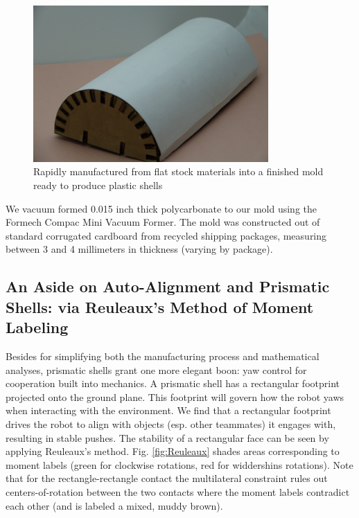 \documentclass[letterpaper]{report}
\begin{document}
\begin{figure}
\centering
\includegraphics[width=0.8\textwidth]{FinishedMold.jpg}
\caption{\label{fig:Finished Mold}Rapidly manufactured from flat stock materials into a finished mold ready to produce plastic shells}
\end{figure}

We vacuum formed 0.015 inch thick polycarbonate to our mold using the Formech Compac Mini Vacuum Former.
The mold was constructed out of standard corrugated cardboard from recycled shipping packages, measuring between 3 and 4 millimeters in thickness (varying by package).

\subsection{An Aside on Auto-Alignment and Prismatic Shells: via Reuleaux's Method of Moment Labeling \label{sec:Reuleaux}}
Besides for simplifying both the manufacturing process and mathematical analyses, prismatic shells grant one more elegant boon: yaw control for cooperation built into mechanics.
A prismatic shell has a rectangular footprint projected onto the ground plane.
This footprint will govern how the robot yaws when interacting with the environment.
We find that a rectangular footprint drives the robot to align with objects (esp. other teammates) it engages with, resulting in stable pushes.
The stability of a rectangular face can be seen by applying Reuleaux's method.
Fig. \ref{fig:Reuleaux} shades areas corresponding to moment labels (green for clockwise rotations, red for widdershins rotations).
Note that for the rectangle-rectangle contact the multilateral constraint rules out centers-of-rotation between the two contacts where the moment labels contradict each other (and is labeled a mixed, muddy brown).
\end{document}
